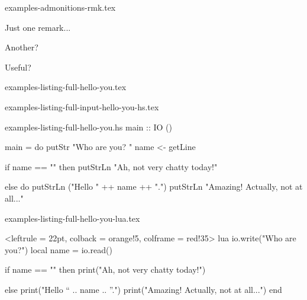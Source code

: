 \begin{filecontents*}[overwrite]{examples-admonitions-rmk.tex}
\begin{tdocrem}
    Just one remark...
\end{tdocrem}

\begin{tdocrem}
    Another?
\end{tdocrem}

\begin{tdocrem}
    Useful?
\end{tdocrem}
\end{filecontents*}


\begin{filecontents*}[overwrite]{examples-listing-full-hello-you.tex}
\end{filecontents*}


\begin{filecontents*}[overwrite]{examples-listing-full-input-hello-you-hs.tex}
\end{filecontents*}


\begin{filecontents*}[overwrite]{examples-listing-full-hello-you.hs}
main :: IO ()

main = do
    putStr "Who are you? "
    name <- getLine

    if name == ""
        then putStrLn "Ah, not very chatty today!"

    else do
        putStrLn ("Hello " ++ name ++ ".")
        putStrLn "Amazing! Actually, not at all..."
\end{filecontents*}


\begin{filecontents*}[overwrite]{examples-listing-full-hello-you-lua.tex}
\begin{tdoccode}[style = solarized-light, linenos]%
                <leftrule = 22pt, colback = orange!5, colframe = red!35>%
                {lua}
io.write("Who are you?")
local name = io.read()

if name == "" then
    print("Ah, not very chatty today!")

else
    print("Hello “ .. name .. ”.")
    print("Amazing! Actually, not at all...")
end
\end{tdoccode}
\end{filecontents*}


